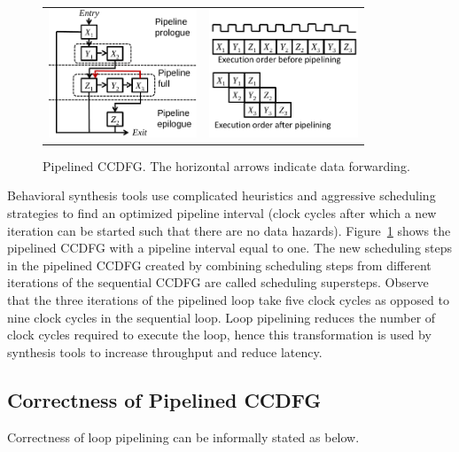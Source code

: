 \begin{figure}
\begin{center}
\begin{tabular}{cc}
\includegraphics[height=1.5in]{fig-rpe/pipelined_ccdfg}
& \hspace{0.5cm}
\includegraphics[height=1.5in]{fig-rpe/pp-clock-cycles}
\end{tabular}
\end{center}
\caption{Pipelined CCDFG. The horizontal arrows indicate data forwarding.}
\label{fig:pp-ccdfg}
\end{figure}

Behavioral synthesis tools use complicated heuristics and aggressive scheduling strategies to find an optimized pipeline interval (clock cycles after which a new iteration can be started such that there are no data hazards). Figure~\ref{fig:pp-ccdfg} shows the pipelined CCDFG with a pipeline interval equal to one. The new scheduling steps in the pipelined CCDFG created by combining scheduling steps from different iterations of the sequential CCDFG are called scheduling supersteps. Observe that the three iterations of the pipelined loop take five clock cycles as opposed to nine clock cycles in the sequential loop. Loop pipelining reduces the number of clock cycles required to execute the loop, hence this transformation is used by synthesis tools to increase throughput and reduce latency.  

\subsection{Correctness of Pipelined CCDFG}
\label{subsec:correctness-defn}

Correctness of loop pipelining can be informally stated as below.

